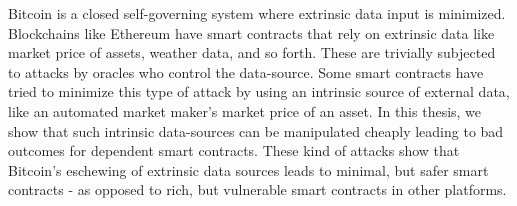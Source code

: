 Bitcoin is a closed self-governing system where extrinsic data input is minimized. Blockchains like Ethereum have smart contracts that rely on extrinsic data like market price of assets, weather data, and so forth. These are trivially subjected to attacks by oracles who control the data-source. Some smart contracts have tried to minimize this type of attack by using an intrinsic source of external data, like an automated market maker's market price of an asset. In this thesis, we show that such intrinsic data-sources can be manipulated cheaply leading to bad outcomes for dependent smart contracts. These kind of attacks show that Bitcoin's eschewing of extrinsic data sources leads to minimal, but safer smart contracts - as opposed to rich, but vulnerable smart contracts in other platforms.